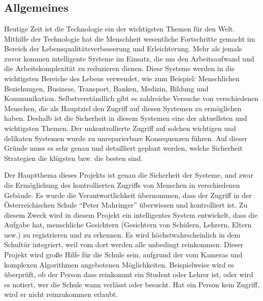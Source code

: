 \chapter{\docname}
\label{\docname}
\section{Allgemeines}
Heutige Zeit ist die Technologie ein der wichtigsten Themen für den Welt. Mithilfe der Technologie hat die Menschheit wesentliche Fortschritte gemacht im Bereich der Lebensqualitätsverbesserung und Erleichterung. Mehr als jemals zuvor kommen intelligente Systeme im Einsatz, die um den Arbeitsaufwand und die Arbeitskomplexität zu reduzieren dienen. Diese Systeme werden in die wichtigsten Bereiche des Lebens verwendet, wie zum Beispiel: Menschlichen Beziehungen, Business, Transport, Banken, Medizin, Bildung und Kommunikation. Selbstverständlich gibt es zahlreiche Versuche von verschiedenen Menschen, die als Hauptziel den Zugriff auf diesen Systemen zu ermöglichen haben. Deshalb ist die Sicherheit in diesem Systemen eine der aktuellsten und wichtigsten Themen. Der unkontrollierte Zugriff auf solchen wichtigen und delikaten Systemen wurde zu unreparierbare Konsequenzen führen. Auf dieser Gründe muss es sehr genau und detailliert geplant werden, welche Sicherheit Strategien die klügsten bzw. die besten sind.  

Der Hauptthema dieses Projekts ist genau die Sicherheit der Systeme, und zwar die Ermöglichung des kontrollierten Zugriffs von Menschen in verschiedenen Gebäude. Es wurde die Verantwortlichkeit übernommen, dass der Zugriff in der Österreichischen Schule “Peter Mahringer” überwiesen und kontrolliert ist. Zu diesem Zweck wird in diesem Projekt ein intelligentes System entwickelt, dass die Aufgabe hat, menschliche Gesichtern (Gesichtern von Schülern, Lehrern, Eltern usw.) zu registrieren und zu erkennen. Es wird höchstwahrscheinlich in dem Schultür integriert, weil vom dort werden alle unbedingt reinkommen. Dieser Projekt wird große Hilfe für die Schule sein, aufgrund der vom Kameras und komplexen Algorithmen angebotenen Möglichkeiten. Beispielweise wird es überprüft, ob der Person dass reinkommt ein Student oder Lehrer ist, oder wird es notiert, wer die Schule wann verlässt oder besucht. Hat ein Person kein Zugriff, wird er nicht reinzukommen erlaubt.

